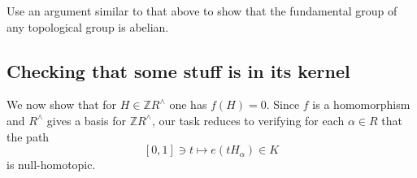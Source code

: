 \documentclass[reqno]{amsart} 
\begin{document}
\begin{exercise}
  Use an argument similar to that above to show that the fundamental group of any topological group is abelian.
\end{exercise}

\subsection{Checking that some stuff is in its kernel}
\label{sec:org9527204}
We now show that for $H \in \mathbb{Z} R^\wedge$ one has $f(H) = 0$.  Since $f$ is a homomorphism and $R^\wedge$ gives a basis for $\mathbb{Z} R^\wedge$, our task reduces to verifying for each $\alpha \in R$ that the path
\begin{equation}\label{eq:path-to-be-shown-is-nullhomotopic}
 [0,1] \ni t
  \mapsto e(t H_\alpha) \in K
\end{equation}
is null-homotopic.
\end{document}
